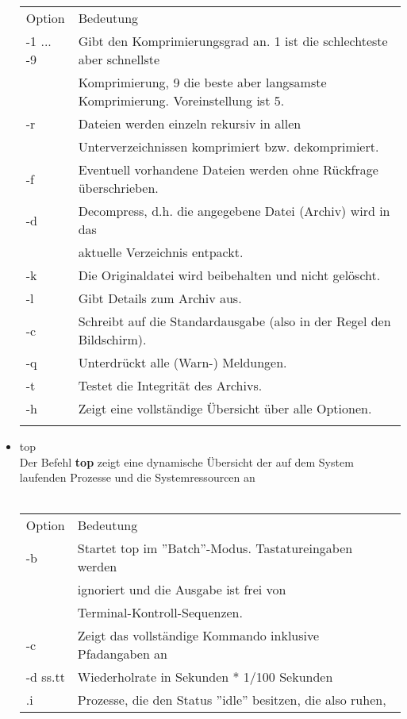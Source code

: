 \begin{itemize}
			\begin{tabular}{ll}
				Option & Bedeutung \\
				-1 ... -9 & Gibt den Komprimierungsgrad an. 1 ist die schlechteste aber schnellste\\
				& Komprimierung, 9 die beste aber langsamste Komprimierung. Voreinstellung ist 5.\\
				-r & Dateien werden einzeln rekursiv in allen\\
				& Unterverzeichnissen komprimiert bzw. dekomprimiert.\\
				-f & Eventuell vorhandene Dateien werden ohne R\"uckfrage \"uberschrieben.\\
				-d & Decompress, d.h. die angegebene Datei (Archiv) wird in das\\
				& aktuelle Verzeichnis entpackt.\\
				-k & Die Originaldatei wird beibehalten und nicht gel\"oscht.\\
				-l & Gibt Details zum Archiv aus.\\
				-c & Schreibt auf die Standardausgabe (also in der Regel den Bildschirm).\\
				-q & Unterdr\"uckt alle (Warn-) Meldungen.\\
				-t & Testet die Integrit\"at des Archivs.\\
				-h & Zeigt eine vollst\"andige \"Ubersicht über alle Optionen.\\ \\ 
			\end{tabular}
			\newpage
			\item top\\
			Der Befehl \textbf{top} zeigt eine dynamische \"Ubersicht der auf dem System laufenden Prozesse und die Systemressourcen an\\ \\
			\begin{tabular}{ll}
				Option & Bedeutung \\
				-b & Startet top im ''Batch''-Modus. Tastatureingaben werden\\
				& ignoriert und die Ausgabe ist frei von\\
				& Terminal-Kontroll-Sequenzen.\\
				-c & Zeigt das vollst\"andige Kommando inklusive Pfadangaben an\\
				-d ss.tt & Wiederholrate in Sekunden * 1/100 Sekunden\\
				.i & Prozesse, die den Status ''idle'' besitzen, die also ruhen,\\

\end{tabular}
\end{itemize}
